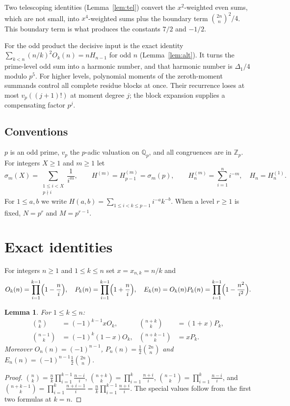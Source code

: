 \documentclass[11pt]{amsart}
\newtheorem{lemma}[theorem]{Lemma}
\theoremstyle{definition}
\theoremstyle{remark}
\newcommand{\Q}{\mathbb{Q}}
\newcommand{\Zp}{\mathbb{Z}_p}
\newcommand{\vp}{v_p}
\newcommand{\bin}[2]{\binom{#1}{#2}}
\begin{document}
Two telescoping identities (Lemma~\ref{lem:tel}) convert the $x^2$-weighted even sums, which
are not small, into $x^4$-weighted sums plus the boundary term $\binom{2n}n^2/4$. This boundary
term is what produces the constants $7/2$ and $-1/2$.

For the odd product the decisive input is the exact identity
$\sum_{k<n}(n/k)^2O_k(n)=nH_{n-1}$ for odd $n$ (Lemma~\ref{lem:alt}). It turns the
prime-level odd sum into a harmonic number, and that harmonic number is $\Delta_1/4$
modulo $p^5$.
For higher levels, polynomial moments of the zeroth-moment summands control
all complete residue blocks at once. Their recurrence loses at most
$v_p((j+1)!)$ at moment degree $j$; the block expansion supplies a compensating
factor $p^j$.

\subsection*{Conventions}
$p$ is an odd prime, $\vp$ the $p$-adic valuation on $\Q_p$, and all congruences are in $\Zp$.
For integers $X\ge1$ and $m\ge1$ let
\[
\sigma_m(X)=\sum_{\substack{1\le i<X\\ p\nmid i}}\frac1{i^m},\qquad H^{(m)}=H^{(m)}_{p-1}=\sigma_m(p),\qquad
H_n^{(m)}=\sum_{i=1}^n i^{-m},\quad H_n=H_n^{(1)}.
\]
For $1\le a,b$ we write $H(a,b)=\sum_{1\le i<k\le p-1}i^{-a}k^{-b}$.
When a level $r\ge1$ is fixed, $N=p^r$ and $M=p^{r-1}$.

\section{Exact identities}

For integers $n\ge1$ and $1\le k\le n$ set $x=x_{n,k}=n/k$ and
\[
O_k(n)=\prod_{i=1}^{k-1}\Bigl(1-\frac ni\Bigr),\quad
P_k(n)=\prod_{i=1}^{k-1}\Bigl(1+\frac ni\Bigr),\quad
E_k(n)=O_k(n)P_k(n)=\prod_{i=1}^{k-1}\Bigl(1-\frac{n^2}{i^2}\Bigr).
\]

\begin{lemma}\label{lem:fact}
For $1\le k\le n$:
\begin{align*}
\bin nk&=(-1)^{k-1}xO_k,& \bin{n+k}k&=(1+x)P_k,\\
\bin{n-1}k&=(-1)^k(1-x)O_k,&\bin{n+k-1}k&=xP_k .
\end{align*}
Moreover $O_n(n)=(-1)^{n-1}$, $P_n(n)=\tfrac12\binom{2n}n$ and $E_n(n)=(-1)^{n-1}\tfrac12\binom{2n}n$.
\end{lemma}
\begin{proof}
$\binom nk=\frac nk\prod_{i=1}^{k-1}\frac{n-i}{i}$, $\binom{n+k}k=\prod_{i=1}^k\frac{n+i}i$,
$\binom{n-1}k=\prod_{i=1}^k\frac{n-i}i$, and
$\binom{n+k-1}k=\prod_{i=1}^k\frac{n+i-1}i=\frac nk\prod_{i=1}^{k-1}\frac{n+i}i$.
The special values follow from the first two formulas at $k=n$.
\end{proof}
\end{document}
